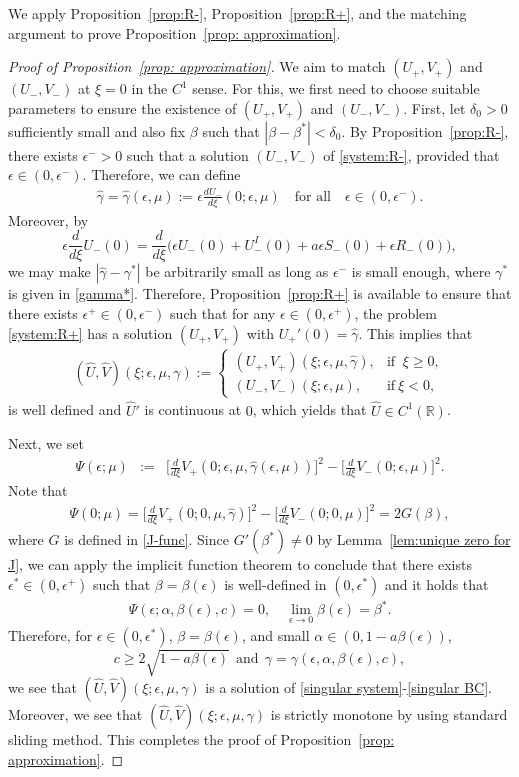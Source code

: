 \documentclass[11pt,a4paper]{article}
\numberwithin{equation}{section}
\numberwithin{figure}{section}
\newcommand\ep{\epsilon}
\newcommand\beaa{\begin{eqnarray*}}
\newcommand\eeaa{\end{eqnarray*}}
\begin{document}
We apply Proposition~\ref{prop:R-}, Proposition~\ref{prop:R+}, and the matching argument to prove Proposition~\ref{prop: approximation}.

\begin{proof}[Proof of Proposition~\ref{prop: approximation}]
We aim to match $(U_+,V_+)$ and $(U_-,V_-)$ at $\xi=0$ in the $C^1$ sense.
For this, we first need to choose suitable parameters to ensure the existence of
$(U_+,V_+)$ and $(U_-,V_-)$.
First, let $\delta_0>0$ sufficiently small and also fix $\beta$ such that $|\beta-\beta^*|<\delta_0$.
By Proposition~\ref{prop:R-}, there exists $\ep^->0$ such that a solution $(U_-,V_-)$ of \eqref{system:R-}, provided that $\ep\in(0,\ep^-)$.
Therefore, we can define
\beaa
\hat\gamma=\hat\gamma(\ep,\mu):=\ep \frac{dU_-}{d\xi}(0;\ep,\mu)\quad \text{for all}\quad \ep\in(0,\ep^-).
\eeaa
Moreover, by
$$\epsilon\frac{d}{d\xi}U_-(0)=\frac{d}{d\xi}\Big(\epsilon U_-(0)+U_-^I(0)+a\epsilon S_-(0)+\epsilon R_-(0)\Big),$$
we may make $|\hat\gamma-\gamma^*|$ be arbitrarily small as long as $\ep^-$ is small enough, where $\gamma^*$ is given in
\eqref{gamma*}.
Therefore, Proposition~\ref{prop:R+} is available
to ensure that there exists $\ep^+\in(0,\ep^-)$ such that for any
$\ep\in(0,\ep^+)$, the problem \eqref{system:R+} has a solution $(U_{+},V_{+})$ with $U_+'(0)=\hat\gamma$. This implies that
\beaa
(\hat{U},\hat{V})(\xi;\ep,\mu,\gamma):=\begin{cases}
                             (U_+,V_+)(\xi;\ep,\mu,\hat\gamma), & \mbox{if }\ \xi\geq 0, \\
                             (U_-,V_-)(\xi;\ep,\mu), & \mbox{if}\ \xi<0,
                           \end{cases}
\eeaa
is well defined and $\hat{U}'$ is continuous at $0$, which yields that $\hat{U}\in C^1(\mathbb{R})$.



Next, we set
\beaa
\Psi(\ep;\mu)&:=&\Big[\frac{d}{d\xi}V_+(0;\ep,\mu,\hat\gamma(\ep,\mu))\Big]^2-\Big[\frac{d}{d\xi}V_-(0;\ep,\mu)\Big]^2.
\eeaa
Note that
\beaa
\Psi(0;\mu)=\Big[\frac{d}{d\xi}V_+(0;0,\mu,\hat\gamma)\Big]^2-\Big[\frac{d}{d\xi}V_-(0;0,\mu)\Big]^2=2G(\beta),
\eeaa
where $G$ is defined in \eqref{J-func}.
Since $G'(\beta^*)\neq 0$ by Lemma~\ref{lem:unique zero for J}, we can apply the implicit function theorem to conclude that
there exists $\ep^{*}\in(0,\ep^+)$ such that $\beta=\beta(\ep)$ is well-defined in $(0,\ep^{*})$ and it holds that
\beaa
\Psi(\ep;\alpha,\beta(\ep),c)=0,\quad \lim_{\ep\to0}\beta(\ep)=\beta^*.
\eeaa
Therefore, for $\ep\in(0,\ep^{*})$, $\beta=\beta(\ep)$, and small $\alpha\in (0,1-a\beta(\epsilon))$, 
$$c\geq 2\sqrt{1-a\beta(\ep)}\ \ \text{and}\ \ \gamma=\gamma(\ep,\alpha,\beta(\ep),c),$$
we see that $(\hat{U},\hat{V})(\xi;\ep,\mu,\gamma)$ is a solution of \eqref{singular system}-\eqref{singular BC}. Moreover, we see that $(\hat{U},\hat{V})(\xi;\ep,\mu,\gamma)$ is strictly monotone by using standard sliding method.
This completes the proof of Proposition~\ref{prop: approximation}.
\end{proof}
\end{document}
